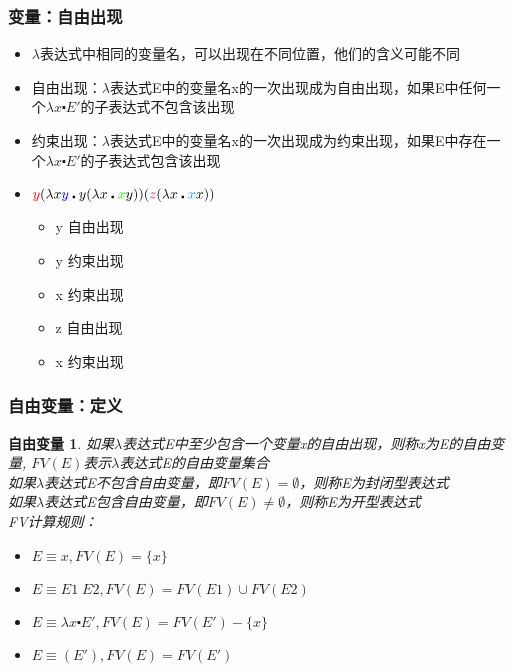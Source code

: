\documentclass[CJKutf8,compress,hyperref]{beamer}
\begin{document}
\begin{CJK}{UTF8}{song}
\begin{frame} 
  \frametitle{变量：自由出现}  
  \begin{itemize}
  \item $\lambda$表达式中相同的变量名，可以出现在不同位置，他们的含义可能不同
  \item 自由出现：$\lambda$表达式E中的变量名x的一次出现成为自由出现，如果E中任何一个$\lambda x \centerdot E'$的子表达式不包含该出现 
  \item 约束出现：$\lambda$表达式E中的变量名x的一次出现成为约束出现，如果E中存在一个$\lambda x \centerdot E'$的子表达式包含该出现 
  \item ${\color{red}y}(\lambda x {\color{blue}y} \centerdot
    y (\lambda x \centerdot {\color{green}x}y))
    ({\color{magenta}z} (\lambda x \centerdot {\color{cyan}x}x))$ 
    \begin{itemize} 
    \item {\color{red}y} 自由出现
    \item {\color{blue}y} 约束出现 
    \item {\color{green}x} 约束出现 
    \item {\color{magenta}z} 自由出现 
    \item {\color{cyan}x} 约束出现 
    \end{itemize} 
  \end{itemize}  
\end{frame}

\begin{frame}
  \frametitle{自由变量：定义} 
  \newtheorem{fv}{自由变量} 
  \begin{fv}
    如果$\lambda$表达式E中至少包含一个变量x的自由出现，则称x为E的{\color{red}自由变量}, $FV(E)$表示$\lambda$表达式E的自由变量集合 \\ 
    如果$\lambda$表达式E不包含自由变量，即$FV(E) = \emptyset$，则称E为封闭型表达式\\ 
    如果$\lambda$表达式E包含自由变量，即$FV(E) \neq \emptyset$，则称E为开型表达式 \\ 
    FV计算规则： 
    \begin{itemize} 
    \item  
      $E \equiv x , FV(E) = \{ x \}$
    \item       
      $E \equiv E1 \; E2,  FV(E) =  FV(E1) \cup FV(E2) $    
    \item
      $E \equiv \lambda x \centerdot E',  FV(E) =  FV(E')
      -\{ x \}     $
    \item
      $E \equiv (E'), FV(E) =  FV(E') $
    \end{itemize}
  \end{fv} 
\end{frame}


\end{CJK}
\end{document}
